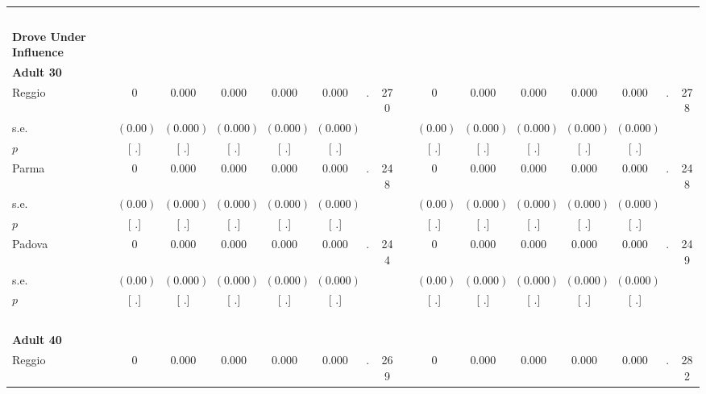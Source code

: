 \begin{longtable}{L{8em} c c c c c c c p{1em} c c c c c c c}
~\\[1em]
\textbf{Drove Under Influence} \\*
\quad \quad \textbf{Adult 30} & & & & & & & & & & & & & & & \\* 
\quad \quad \quad Reggio& 0 &     0.000 &     0.000 &     0.000 &     0.000 &         . &       270 & & 0 &     0.000 &     0.000 &     0.000 &     0.000 &         . &       278  \\*
\quad \quad \quad \quad s.e.& $ (     0.00)$ & $ (    0.000)$ & $ (    0.000)$ & $ (    0.000)$ & $ (    0.000)$ & & & & $ (     0.00)$ & $ (    0.000)$ & $ (    0.000)$ & $ (    0.000)$ & $ (    0.000)$ & &  \\*
\quad \quad \quad \quad $ p$ & [        .] & [        .] & [        .] & [        .] & [        .] & & & & [        .] & [        .] & [        .] & [        .] & [        .] & &  \\[1em]
\quad \quad \quad Parma& 0 &     0.000 &     0.000 &     0.000 &     0.000 &         . &       248 & & 0 &     0.000 &     0.000 &     0.000 &     0.000 &         . &       248  \\*
\quad \quad \quad \quad s.e.& $ (     0.00)$ & $ (    0.000)$ & $ (    0.000)$ & $ (    0.000)$ & $ (    0.000)$ & & & & $ (     0.00)$ & $ (    0.000)$ & $ (    0.000)$ & $ (    0.000)$ & $ (    0.000)$ & &  \\*
\quad \quad \quad \quad $ p$ & [        .] & [        .] & [        .] & [        .] & [        .] & & & & [        .] & [        .] & [        .] & [        .] & [        .] & &  \\[1em]
\quad \quad \quad Padova& 0 &     0.000 &     0.000 &     0.000 &     0.000 &         . &       244 & & 0 &     0.000 &     0.000 &     0.000 &     0.000 &         . &       249  \\*
\quad \quad \quad \quad s.e.& $ (     0.00)$ & $ (    0.000)$ & $ (    0.000)$ & $ (    0.000)$ & $ (    0.000)$ & & & & $ (     0.00)$ & $ (    0.000)$ & $ (    0.000)$ & $ (    0.000)$ & $ (    0.000)$ & &  \\*
\quad \quad \quad \quad $ p$ & [        .] & [        .] & [        .] & [        .] & [        .] & & & & [        .] & [        .] & [        .] & [        .] & [        .] & &  \\[1em]
~\\[1em]
\quad \quad \textbf{Adult 40} & & & & & & & & & & & & & & & \\* 
\quad \quad \quad Reggio& 0 &     0.000 &     0.000 &     0.000 &     0.000 &         . &       269 & & 0 &     0.000 &     0.000 &     0.000 &     0.000 &         . &       282  \\*

\end{longtable}
